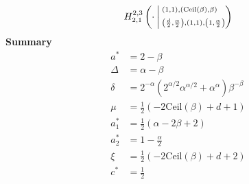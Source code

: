 \documentclass{article}
\newcommand{\FoxH}[5]{H_{#2}^{#1}\left(#3\:\middle\vert\: \begin{subarray}{l}#4\\[0.4em] #5\end{subarray}\right)}
\begin{document}
\begin{align*}
\FoxH{2,3}{2,1}{\cdot}{\left(1, 1\right), \left(\text{Ceil}(\beta ), \beta\right)}{\left(\frac{d}{2}, \frac{\alpha }{2}\right), \left(1, 1\right), \left(1, \frac{\alpha }{2}\right)}
\end{align*}
\noindent\textbf{Summary}
\begin{align*}
a^* &= 2-\beta \\
\Delta &= \alpha -\beta \\
\delta &= 2^{-\alpha } \left(2^{\alpha /2} \alpha ^{\alpha /2}+\alpha ^{\alpha }\right) \beta ^{-\beta } \\
\mu &= \frac{1}{2} (-2 \text{Ceil}(\beta )+d+1) \\
a_1^* &= \frac{1}{2} (\alpha -2 \beta +2) \\
a_2^* &= 1-\frac{\alpha }{2} \\
\xi &= \frac{1}{2} (-2 \text{Ceil}(\beta )+d+2) \\
c^* &= \frac{1}{2} \\
\end{align*}
\end{document}
